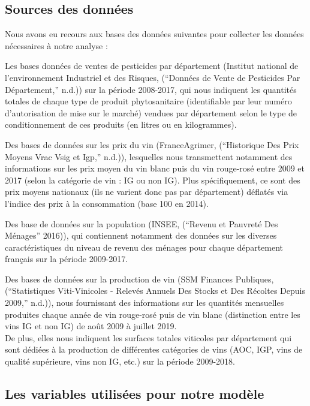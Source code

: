 \documentclass[11pt,]{article}
\begin{document}
\hypertarget{sources-des-donnees}{%
\subsection{Sources des données}\label{sources-des-donnees}}

Nous avons eu recours aux bases des données suivantes pour collecter les
données nécessaires à notre analyse :

Les bases données de ventes de pesticides par département (Institut
national de l'environnement Industriel et des Risques, (``Données de
Vente de Pesticides Par Département,'' n.d.)) sur la période 2008-2017,
qui nous indiquent les quantités totales de chaque type de produit
phytosanitaire (identifiable par leur numéro d'autorisation de mise sur
le marché) vendues par département selon le type de conditionnement de
ces produits (en litres ou en kilogrammes).

Des bases de données sur les prix du vin (FranceAgrimer, (``Historique
Des Prix Moyens Vrac Vsig et Igp,'' n.d.)), lesquelles nous transmettent
notamment des informations sur les prix moyen du vin blanc puis du vin
rouge-rosé entre 2009 et 2017 (selon la catégorie de vin : IG ou non
IG). Plus spécifiquement, ce sont des prix moyens nationaux (ils ne
varient donc pas par département) déflatés via l'indice des prix à la
consommation (base 100 en 2014).

Des base de données sur la population (INSEE, (``Revenu et Pauvreté Des
Ménages'' 2016)), qui contiennent notamment des données sur les diverses
caractéristiques du niveau de revenu des ménages pour chaque département
français sur la période 2009-2017.

Des bases de données sur la production de vin (SSM Finances Publiques,
(``Statistiques Viti-Vinicoles - Relevés Annuels Des Stocks et Des
Récoltes Depuis 2009,'' n.d.)), nous fournissant des informations sur
les quantités mensuelles produites chaque année de vin rouge-rosé puis
de vin blanc (distinction entre les vins IG et non IG) de août 2009 à
juillet 2019.\\
De plus, elles nous indiquent les surfaces totales viticoles par
département qui sont dédiées à la production de différentes catégories
de vins (AOC, IGP, vins de qualité supérieure, vins non IG, etc.) sur la
période 2009-2018.

\hypertarget{les-variables-utilisees-pour-notre-modele}{%
\subsection{Les variables utilisées pour notre
modèle}\label{les-variables-utilisees-pour-notre-modele}}
\end{document}
